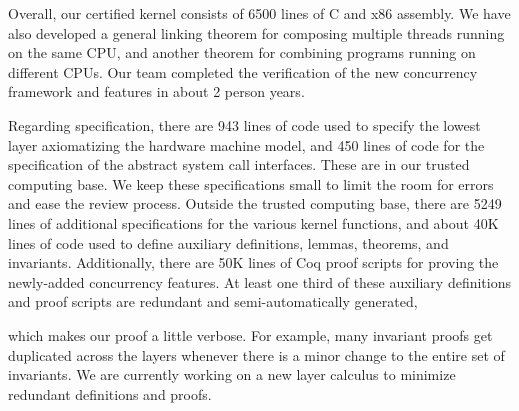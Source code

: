 Overall, our certified \mCTOS{} kernel consists of 6500 lines of C and
x86 assembly. We have also developed a general linking theorem for
composing multiple threads running on the same CPU, and another
theorem for combining programs running on different CPUs.  Our team
completed the verification of the new concurrency framework and
features in about 2 person years.

Regarding specification, there are 943 lines of code used to specify
the lowest layer axiomatizing the hardware machine model, and 450
lines of code for the specification of the abstract system call
interfaces. These are in our trusted computing base. We keep these
specifications small to limit the room for errors and ease the review
process.  Outside the trusted computing base, there are 5249 lines of
additional specifications for the various kernel functions, and about
40K lines of code used to define auxiliary definitions, lemmas,
theorems, and invariants. Additionally, there are 50K lines of Coq
proof scripts for proving the newly-added concurrency features. At least
one third of these auxiliary definitions and proof scripts are
redundant and semi-automatically generated, which makes our proof a little verbose.  For example, many
invariant proofs get duplicated across the layers whenever there is a
minor change to the entire set of invariants.  We are currently
working on a new layer calculus to minimize redundant definitions and
proofs.



